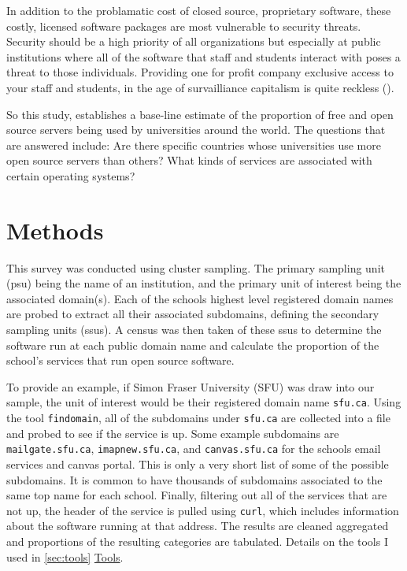 \documentclass{article}
\theoremstyle{definition}
\begin{document}
\begin{flushleft}
\begin{multicols}{2}
In addition to the problamatic cost of closed source, proprietary
software, these costly, licensed software packages are most vulnerable
to security threats.
Security should be a high priority of all organizations but
especially at public institutions where all of the software that staff and
students interact with poses a threat to those individuals.
Providing one for profit company exclusive access to your staff and
students, in the age of survailliance capitalism is quite reckless
(\cite{karen2018}).

So this study, establishes a base-line estimate
of the proportion of free and open source servers being used by
universities around the world.
The questions that are answered include:
Are there specific countries whose universities
use more open source servers than others? What kinds of services
are associated with certain operating systems?

\section{Methods}
This survey was conducted using cluster sampling.
The primary sampling unit (psu) being the name
of an institution, and the primary unit of interest
being the associated domain(s). Each of the schools
highest level registered domain names are probed to
extract all their associated subdomains, defining the secondary
sampling units (ssus).
A census was then taken of these ssus
to determine the software run at each public domain name and
calculate the proportion of the school's services that
run open source software.

To provide an example, if Simon Fraser University (SFU)
was draw into our sample, the unit of interest would be
their registered domain name \texttt{sfu.ca}. Using the
tool \texttt{findomain}, all of the subdomains under
\texttt{sfu.ca} are collected into a file and probed to see if the service is up.
Some example subdomains are \texttt{mailgate.sfu.ca},
\texttt{imapnew.sfu.ca}, and \texttt{canvas.sfu.ca} for
the schools email services and canvas portal. This is
only a very short list of some of the possible subdomains.
It is common to have thousands of subdomains associated
to the same top name for each school. Finally, filtering out all of
the services that are not up, the header of the service is pulled
using \texttt{curl}, which includes information about the software
running at that address. The results are cleaned aggregated and proportions
of the resulting categories are tabulated.
Details on the tools I used in \autoref{sec:tools} \hyperref[sec:tools]{Tools}.


\end{multicols}
\end{flushleft}
\end{document}
